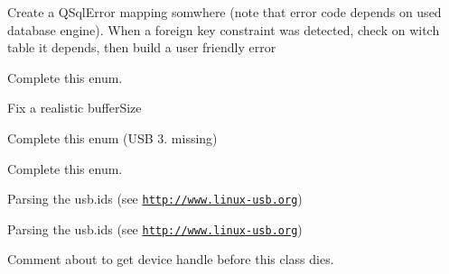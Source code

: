 \begin{DoxyRefList}
\item[\label{todo__todo000091}%
\hypertarget{todo__todo000091}{}%
Member \hyperlink{classmdt_tt_test_node_unit_a9da3578291033f5f9d77f186fe2fb325}{mdt\-Tt\-Test\-Node\-Unit\-:\-:get\-Test\-Links\-Depending\-On\-Connection} (const Q\-Variant \&test\-Node\-Unit\-Connection\-Id, bool \&ok)]Create a Q\-Sql\-Error mapping somwhere (note that error code depends on used database engine). When a foreign key constraint was detected, check on witch table it depends, then build a user friendly error  
\item[\label{todo__todo000039}%
\hypertarget{todo__todo000039}{}%
Member \hyperlink{classmdt_usb_control_transfer_a80b0f5ac6d8ae7b7e7471b012c34937d}{mdt\-Usb\-Control\-Transfer\-:\-:Descriptor\-Type\-\_\-t} ]Complete this enum.  
\item[\label{todo__todo000041}%
\hypertarget{todo__todo000041}{}%
Member \hyperlink{classmdt_usb_control_transfer_a66bfbc135c55bf10377d68cf23d91d0d}{mdt\-Usb\-Control\-Transfer\-:\-:mdt\-Usb\-Control\-Transfer} (libusb\-\_\-device\-\_\-handle $\ast$dev\-\_\-handle, int buffer\-Size=1024)]Fix a realistic buffer\-Size 
\item[\label{todo__todo000040}%
\hypertarget{todo__todo000040}{}%
Member \hyperlink{classmdt_usb_control_transfer_acae7a9c10825dd7fa7695a16986a2f36}{mdt\-Usb\-Control\-Transfer\-:\-:Standard\-Feature\-Selector\-\_\-t} ]Complete this enum (U\-S\-B 3. missing)  
\item[\label{todo__todo000038}%
\hypertarget{todo__todo000038}{}%
Member \hyperlink{classmdt_usb_control_transfer_a9a13f68d5d4998dd8564c4e4c6278c77}{mdt\-Usb\-Control\-Transfer\-:\-:Standard\-Request\-Code\-\_\-t} ]Complete this enum.  
\item[\label{todo__todo000043}%
\hypertarget{todo__todo000043}{}%
Member \hyperlink{classmdt_usb_device_descriptor_a626afc71d8e72600f12259ac6f5a5866}{mdt\-Usb\-Device\-Descriptor\-:\-:product\-Name} () const ]Parsing the usb.\-ids (see \href{http://www.linux-usb.org}{\tt http\-://www.\-linux-\/usb.\-org})  
\item[\label{todo__todo000042}%
\hypertarget{todo__todo000042}{}%
Member \hyperlink{classmdt_usb_device_descriptor_ac2f746ebd5540b65bf00f82c991f5c3b}{mdt\-Usb\-Device\-Descriptor\-:\-:vendor\-Name} () const ]Parsing the usb.\-ids (see \href{http://www.linux-usb.org}{\tt http\-://www.\-linux-\/usb.\-org})  
\item[\label{todo__todo000044}%
\hypertarget{todo__todo000044}{}%
Member \hyperlink{classmdt_usb_device_list_acd0fd4e79b3c9f2eb96105ede458447d}{mdt\-Usb\-Device\-List\-:\-:$\sim$mdt\-Usb\-Device\-List} ()]Comment about to get device handle before this class dies.  

\end{DoxyRefList}
